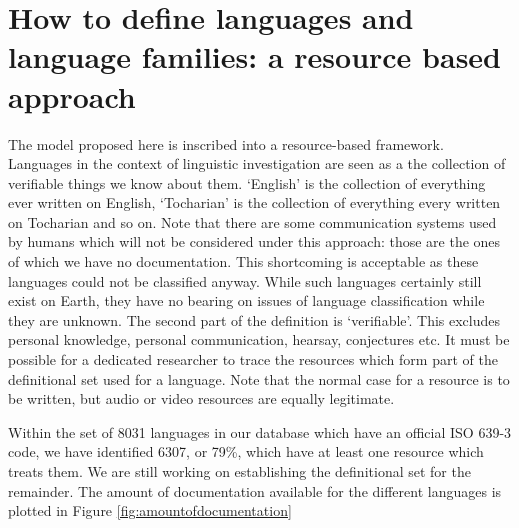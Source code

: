 \documentclass[a4paper,10pt]{article}
\begin{document}
\section{How to define languages and language families: a resource based approach}
The model proposed here is inscribed into a resource-based framework. Languages in the context of linguistic investigation are seen as a the collection of verifiable things we know about them. `English' is the collection of everything ever written on English, `Tocharian' is the collection of everything every written on Tocharian and so on. Note that there are some communication systems used by humans which will not be considered under this approach: those are the ones of which we have no documentation. This shortcoming is acceptable as these languages could not be classified anyway. While such languages certainly still exist on Earth,  they have no bearing on issues of language classification while they are unknown. The second part of the definition is `verifiable'. This excludes personal knowledge, personal communication, hearsay, conjectures etc. It must be possible for a dedicated researcher to trace the resources which form part of the definitional set used for a language. Note that the normal case for a resource is to be written, but audio or video resources are equally legitimate.

Within the set of 8031 languages in our database which have an official ISO 639-3 code, we have identified 6307, or 79\%, which have at least one resource which treats them. We are still working on establishing the definitional set for the remainder. The amount of documentation available for the different languages is plotted in Figure \ref{fig:amountofdocumentation}
\end{document}
